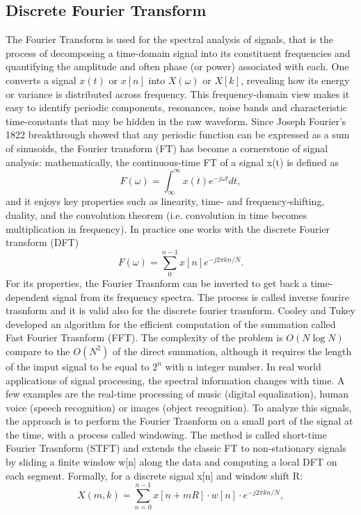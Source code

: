 \subsection{Discrete Fourier Transform}
The Fourier Transform is used for the spectral analysis of signals, that is the process of decomposing a time-domain signal into its constituent frequencies and quantifying the amplitude and often phase (or power) associated with each. One converts a signal $x(t)$ or $x[n]$ into $X(\omega)$ or $X[k]$, revealing how its energy or variance is distributed across frequency. This frequency-domain view makes it easy to identify periodic components, resonances, noise bands and characteristic time-constants that may be hidden in the raw waveform. 
Since Joseph Fourier’s 1822 breakthrough showed that any periodic function can be expressed as a sum of sinusoids, the Fourier transform (FT) has become a cornerstone of signal analysis: mathematically, the continuous‐time FT of a signal x(t) is defined as
$$
F(\omega)=\int_{\infty}^{\infty} x(t) e^{-j\omega t} dt,
$$
and it enjoys key properties such as linearity, time‐ and frequency‐shifting, duality, and the convolution theorem (i.e. convolution in time becomes multiplication in frequency). In practice one works with the discrete Fourier transform (DFT)
$$
F(\omega)=\sum_{0}^{n-1} x[n] e^{-j2\pi kn/N}.
$$
For its properties, the Fourier Trasnform can be inverted to get back a time-dependent signal from its frequency spectra. The process is called inverse fourire trasnform and it is valid also for the discrete fourier trasnform.
Cooley and Tukey developed an algorithm for the efficient computation of the summation called Fast Fourier Trasnform (FFT). The complexity of the problem is $O(N\log N)$ compare to the $O(N^2)$ of the direct summation, although it requires the length of the imput signal to be equal to $2^n$ with n integer number.
In real world applications of signal processing, the spectral information changes with time. A few examples are the real-time processing of music (digital equalization), human voice (speech recognition) or images (object recognition). To analyze this signals, the approach is to perform the Fourier Trasnform on a small part of the signal at the time, with a process called windowing. The method is called short-time Fourier Trasnform (STFT) and extends the classic FT to non-stationary signals by sliding a finite window w[n] along the data and computing a local DFT on each segment. Formally, for a discrete signal x[n] and window shift R:
$$
X(m,k) = \sum _{n=0} ^{n-1} x[n + mR] \cdot w[n] \cdot e^{-j2\pi kn/N},
$$
